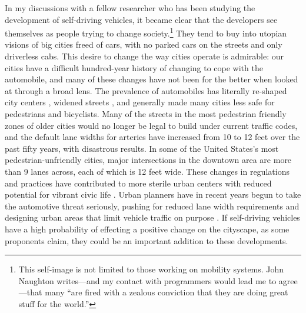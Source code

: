 In my discussions with a fellow researcher who has been studying the
development of self-driving vehicles, it became clear that the
developers see themselves as people trying to change
society.\footnote{This self-image is not limited to those working on
  mobility systems. John Naughton writes---and my contact with
  programmers would lead me to agree---that many ``are fired with a zealous
  conviction that they are doing great stuff for the
  world.''\cite{naughtonTech}}
They
tend to buy into utopian visions of big cities freed of cars, with no
parked cars on the streets and only driverless cabs. This desire to
change the way cities operate is admirable: our cities have a
difficult hundred-year history of changing to cope with the
automobile, and many of these changes have not been for the better
when looked at through a broad lens. The prevalence of automobiles has
literally re-shaped city centers \cite[p. 7]{burdenCities}, widened
streets \cite[p. 10]{burdenCities} \cite[p. 65]{fernandezBoulder}, and generally made many cities less safe for
pedestrians and bicyclists. Many of the streets in the most pedestrian
friendly zones of older cities would no longer be legal to build under
current traffic codes, and the default lane widths for arteries have increased
from 10 to 12 feet over the past fifty years, with disastrous results.\cite{???-http://www.citylab.com/design/2014/10/why-12-foot-traffic-lanes-are-disastrous-for-safety-and-must-be-replaced-now/381117/} In some of the
United States's most pedestrian-unfriendly cities, major intersections
in the downtown area are more than 9 lanes across, each of which is 12
feet wide. These changes in 
regulations and practices have contributed to more sterile urban
centers with reduced potential for vibrant civic life \cite[p. 60]{miaraBoston}. Urban planners have
in recent years begun to take the automotive threat seriously, pushing
for reduced lane width requirements and designing urban areas that
limit vehicle traffic on purpose \cite[p. 67]{fernandezBoulder}. If self-driving
vehicles have a high probability of effecting a positive change on the
cityscape, as some proponents claim, they could be an important
addition to these developments.

